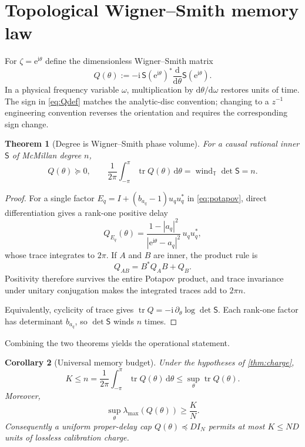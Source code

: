 \documentclass[11pt]{article}
\newtheorem{theorem}{Theorem}[section]
\newtheorem{corollary}[theorem]{Corollary}
\theoremstyle{definition}
\theoremstyle{remark}
\newcommand{\T}{\mathbb{T}}
\newcommand{\tr}{\operatorname{tr}}
\newcommand{\dd}{\mathrm{d}}
\newcommand{\e}{\mathrm{e}}
\begin{document}
\section{Topological Wigner--Smith memory law}

For $\zeta=\e^{\mathrm{i}\theta}$ define the dimensionless Wigner--Smith
matrix
\begin{equation}\label{eq:Qdef}
 Q(\theta):=-\mathrm{i}\,\mathsf S(\e^{\mathrm{i}\theta})^*
 \frac{\dd}{\dd\theta}\mathsf S(\e^{\mathrm{i}\theta}).
\end{equation}
In a physical frequency variable $\omega$, multiplication by
$\dd\theta/\dd\omega$ restores units of time.  The sign in
\eqref{eq:Qdef} matches the analytic-disc convention; changing to a
$z^{-1}$ engineering convention reverses the orientation and requires the
corresponding sign change.

\begin{theorem}[Degree is Wigner--Smith phase volume]
\label{thm:sumrule}
For a causal rational inner $\mathsf S$ of McMillan degree $n$,
\begin{equation}\label{eq:sumrule}
 Q(\theta)\succeq0,
 \qquad
 \frac1{2\pi}\int_{-\pi}^{\pi}\tr Q(\theta)\,\dd\theta
 =\operatorname{wind}_{\T}\det\mathsf S=n.
\end{equation}
\end{theorem}

\begin{proof}
For a single factor
$E_q=I+(b_{a_q}-1)u_qu_q^*$ in \eqref{eq:potapov}, direct differentiation
gives a rank-one positive delay
\begin{equation}\label{eq:poisson}
 Q_{E_q}(\theta)=
 \frac{1-|a_q|^2}{|\e^{\mathrm{i}\theta}-a_q|^2}\,u_qu_q^*,
\end{equation}
whose trace integrates to $2\pi$.  If $A$ and $B$ are inner, the product rule
is
\[
 Q_{AB}=B^*Q_AB+Q_B.
\]
Positivity therefore survives the entire Potapov product, and trace
invariance under unitary conjugation makes the integrated traces add to
$2\pi n$.

Equivalently, cyclicity of trace gives
$\tr Q=-\mathrm{i}\,\partial_\theta\log\det\mathsf S$.  Each rank-one
factor has determinant $b_{a_q}$, so $\det\mathsf S$ winds $n$ times.
\end{proof}

Combining the two theorems yields the operational statement.

\begin{corollary}[Universal memory budget]
\label{cor:memory}
Under the hypotheses of \cref{thm:charge},
\begin{equation}\label{eq:memorybudget}
 K\leq n
 =\frac1{2\pi}\int_{-\pi}^{\pi}\tr Q(\theta)\,\dd\theta
 \leq \sup_\theta\tr Q(\theta).
\end{equation}
Moreover,
\begin{equation}\label{eq:properdelay}
 \sup_\theta\lambda_{\max}(Q(\theta))\geq\frac{K}{N}.
\end{equation}
Consequently a uniform proper-delay cap $Q(\theta)\preceq D I_N$ permits at
most $K\leq ND$ units of lossless calibration charge.
\end{corollary}
\end{document}
